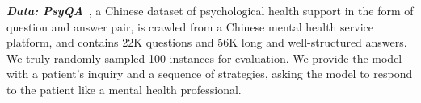 \textbf{\textit{Data: PsyQA}}~\citep{sun-etal-2021-psyqa}, a Chinese dataset of psychological health support in the form of question and answer pair, is crawled from a Chinese mental health service platform, and contains 22K questions and 56K long and well-structured answers. We truly randomly sampled 100 instances for evaluation. We provide the model with a patient's inquiry and a sequence of strategies, asking the model to respond to the patient like a mental health professional.



    

